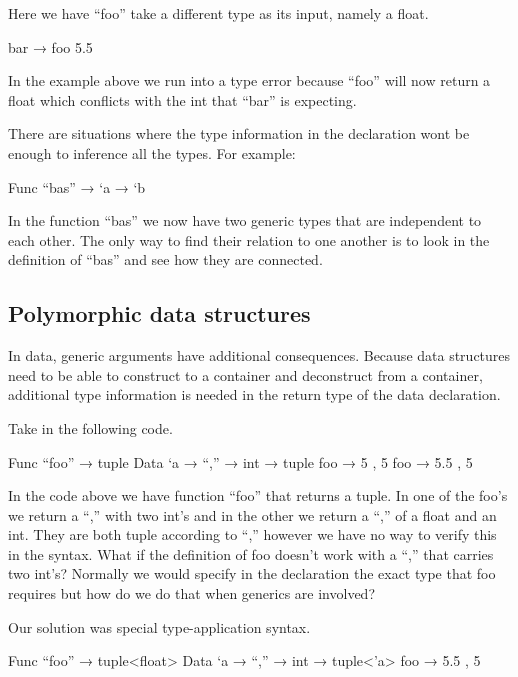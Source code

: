 Here we have “foo” take a different type as its input, namely a float.

\begin{code}
	bar → foo 5.5
\end{code}

In the example above we run into a type error because “foo” will now return a float which conflicts with the int that “bar” is expecting.

There are situations where the type information in the declaration wont be enough to inference all the types. For example:

\begin{code}
	Func “bas” → `a → `b
\end{code}

In the function “bas” we now have two generic types that are independent to each other. 
The only way to find their relation to one another is to look in the definition of “bas” and see how they are connected.

\subsection{Polymorphic data structures}

In data, generic arguments have additional consequences. 
Because data structures need to be able to construct to a container and deconstruct from a container, 
additional type information is needed in the return type of the data declaration.

Take in the following code.

\begin{code}
	Func “foo” → tuple
	Data `a → “,” → int → tuple
	foo → 5 , 5
	foo → 5.5 ,  5
\end{code}

In the code above we have function “foo” that returns a tuple. 
In one of the foo’s we return a “,” with two int’s and in the other we return a “,” of a float and an int. 
They are both tuple according to “,” however we have no way to verify this in the syntax. 
What if the definition of foo doesn’t work with a “,” that carries two int’s? 
Normally we would specify in the declaration the exact type that foo requires but how do we do that when generics are involved?

Our solution was special type-application syntax.

\begin{code}
	Func “foo” → tuple<float>
	Data `a → “,” → int → tuple<’a>
	foo → 5.5 ,  5
\end{code}

